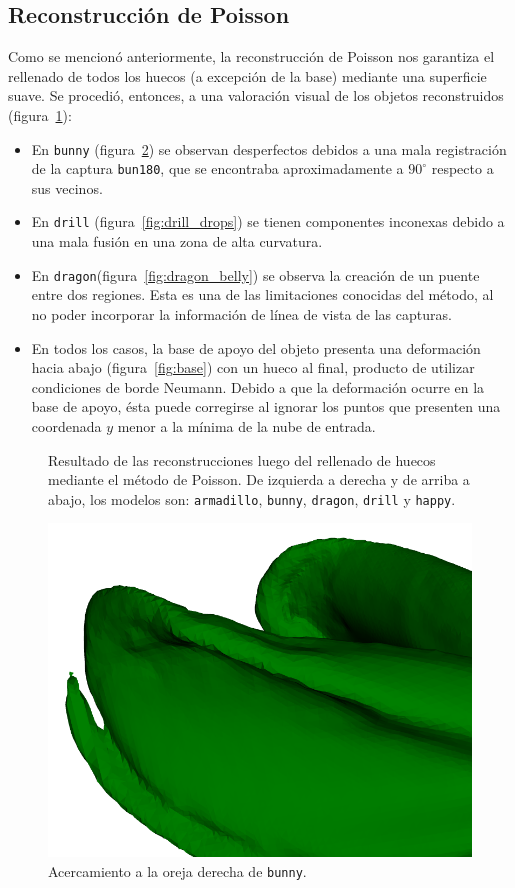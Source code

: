 		\subsection{Reconstrucción de Poisson}
		Como se mencionó anteriormente, la reconstrucción de Poisson nos garantiza el
		rellenado de todos los huecos (a excepción de la base) mediante una superficie suave.
		Se procedió, entonces, a una valoración visual de los objetos reconstruidos (figura~\ref{fig:poiss_all}):
		\begin{itemize}
			\item En \texttt{bunny} (figura~\ref{fig:bun_ear}) se observan desperfectos debidos a una mala registración de la captura \texttt{bun180},
				que se encontraba aproximadamente a $90^{\circ}$ respecto a sus vecinos.
			\item En \texttt{drill} (figura~\ref{fig:drill_drops}) se tienen componentes inconexas debido a una mala fusión en una zona de alta curvatura.
			\item En \texttt{dragon}(figura~\ref{fig:dragon_belly}) se observa la creación de un puente entre dos regiones.
				Esta es una de las limitaciones conocidas del método, al no poder incorporar la información de línea de vista de las capturas\cite{Kazhdan:2006:PSR:1281957.1281965}.
			\item En todos los casos, la base de apoyo del objeto presenta una deformación hacia abajo (figura~\ref{fig:base}) con un hueco al final, producto de utilizar condiciones de borde Neumann.
				Debido a que la deformación ocurre en la base de apoyo, ésta puede corregirse al ignorar
				los puntos que presenten una coordenada $y$ menor a la mínima de la nube de entrada.
		\end{itemize}

		\begin{figure}
			\caption[Resultado de las reconstrucciones]{\label{fig:poiss_all}Resultado de las reconstrucciones luego del rellenado de huecos mediante el método de Poisson.
			De izquierda a derecha y de arriba a abajo, los modelos son:
			\texttt{armadillo},
			\texttt{bunny},
			\texttt{dragon},
			\texttt{drill}
			y \texttt{happy}.}
		\end{figure}

		\begin{figure}
			\centering
			\includegraphics[max width=.5\linewidth, max height=.25\textheight, keepaspectratio]
				{img/bunny_ear}
			\caption[Acercamiento a la oreja derecha de \texttt{bunny}]{\label{fig:bun_ear}Acercamiento a la oreja derecha de \texttt{bunny}.}
		\end{figure}

